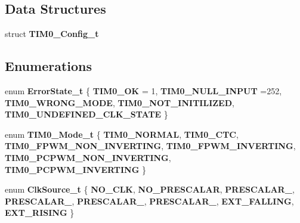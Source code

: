 \subsection*{Data Structures}
\begin{DoxyCompactItemize}
\item 
struct \textbf{ T\+I\+M0\+\_\+\+Config\+\_\+t}
\end{DoxyCompactItemize}
\subsection*{Enumerations}
\begin{DoxyCompactItemize}
\item 
enum \textbf{ Error\+State\+\_\+t} \{ \newline
\textbf{ T\+I\+M0\+\_\+\+OK} = 1, 
\textbf{ T\+I\+M0\+\_\+\+N\+U\+L\+L\+\_\+\+I\+N\+P\+UT} =252, 
\textbf{ T\+I\+M0\+\_\+\+W\+R\+O\+N\+G\+\_\+\+M\+O\+DE}, 
\textbf{ T\+I\+M0\+\_\+\+N\+O\+T\+\_\+\+I\+N\+I\+T\+I\+L\+I\+Z\+ED}, 
\newline
\textbf{ T\+I\+M0\+\_\+\+U\+N\+D\+E\+F\+I\+N\+E\+D\+\_\+\+C\+L\+K\+\_\+\+S\+T\+A\+TE}
 \}
\item 
enum \textbf{ T\+I\+M0\+\_\+\+Mode\+\_\+t} \{ \newline
\textbf{ T\+I\+M0\+\_\+\+N\+O\+R\+M\+AL}, 
\textbf{ T\+I\+M0\+\_\+\+C\+TC}, 
\textbf{ T\+I\+M0\+\_\+\+F\+P\+W\+M\+\_\+\+N\+O\+N\+\_\+\+I\+N\+V\+E\+R\+T\+I\+NG}, 
\textbf{ T\+I\+M0\+\_\+\+F\+P\+W\+M\+\_\+\+I\+N\+V\+E\+R\+T\+I\+NG}, 
\newline
\textbf{ T\+I\+M0\+\_\+\+P\+C\+P\+W\+M\+\_\+\+N\+O\+N\+\_\+\+I\+N\+V\+E\+R\+T\+I\+NG}, 
\textbf{ T\+I\+M0\+\_\+\+P\+C\+P\+W\+M\+\_\+\+I\+N\+V\+E\+R\+T\+I\+NG}
 \}
\item 
enum \textbf{ Clk\+Source\+\_\+t} \{ \newline
\textbf{ N\+O\+\_\+\+C\+LK}, 
\textbf{ N\+O\+\_\+\+P\+R\+E\+S\+C\+A\+L\+AR}, 
\textbf{ P\+R\+E\+S\+C\+A\+L\+A\+R\+\_}, 
\textbf{ P\+R\+E\+S\+C\+A\+L\+A\+R\+\_}, 
\newline
\textbf{ P\+R\+E\+S\+C\+A\+L\+A\+R\+\_}, 
\textbf{ P\+R\+E\+S\+C\+A\+L\+A\+R\+\_}, 
\textbf{ E\+X\+T\+\_\+\+F\+A\+L\+L\+I\+NG}, 
\textbf{ E\+X\+T\+\_\+\+R\+I\+S\+I\+NG}
 \}
\end{DoxyCompactItemize}
